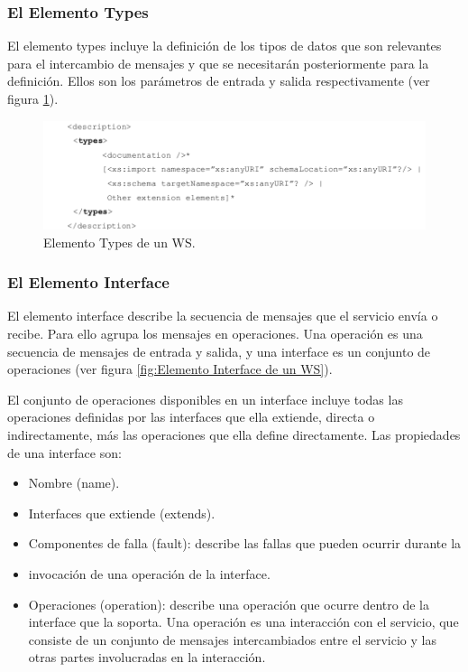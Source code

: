 \subsubsection*{El Elemento Types}

El elemento types incluye la definición de los tipos de datos que son relevantes para el intercambio de mensajes y que se necesitarán posteriormente para la definición. Ellos son los parámetros de entrada y salida respectivamente (ver figura \ref{fig:Elemento Types de un WS}).

\begin{figure}[!h] 
	\begin{center}
		\includegraphics [scale=0.43]{imagenes/elemento_types.png}
	\end{center}
	\caption{Elemento Types de un WS.}
	\label{fig:Elemento Types de un WS}
\end{figure} 

\subsubsection*{El Elemento Interface}

El elemento interface describe la secuencia de mensajes que el servicio envía o recibe. Para ello agrupa los mensajes en operaciones. Una operación es una secuencia de mensajes de entrada y salida, y una interface es un conjunto de operaciones (ver figura \ref{fig:Elemento Interface de un WS}).

El conjunto de operaciones disponibles en un interface incluye todas las operaciones definidas por las interfaces que ella extiende, directa o indirectamente, más las operaciones que ella define directamente. Las propiedades de una interface son:


\begin{itemize}
	\item Nombre (name).
	\item Interfaces que extiende (extends).
	\item Componentes de falla (fault): describe las fallas que pueden ocurrir durante la \item invocación de una operación de la interface.
	\item Operaciones (operation): describe una operación que ocurre dentro de la interface que la soporta. Una operación es una interacción con el servicio, que consiste de un conjunto de mensajes intercambiados entre el servicio y las otras partes involucradas en la interacción.
\end{itemize}

